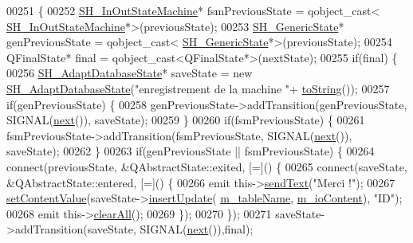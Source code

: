 \begin{DoxyCode}
00251 \{
00252     \hyperlink{classSH__InOutStateMachine}{SH\_InOutStateMachine}* fsmPreviousState = qobject\_cast<
      \hyperlink{classSH__InOutStateMachine}{SH\_InOutStateMachine}*>(previousState);
00253     \hyperlink{classSH__GenericState}{SH\_GenericState}* genPreviousState = qobject\_cast<
      \hyperlink{classSH__GenericState}{SH\_GenericState}*>(previousState);
00254     QFinalState* \textcolor{keyword}{final} = qobject\_cast<QFinalState*>(nextState);
00255     \textcolor{keywordflow}{if}(\textcolor{keyword}{final}) \{
00256         \hyperlink{classSH__AdaptDatabaseState}{SH\_AdaptDatabaseState}* saveState = \textcolor{keyword}{new} 
      \hyperlink{classSH__AdaptDatabaseState}{SH\_AdaptDatabaseState}(\textcolor{stringliteral}{"enregistrement de la machine "}+
      \hyperlink{classSH__InOutStateMachine_a60ecd7de03d948e2d1e9cbedb5c3e5fa}{toString}());
00257         \textcolor{keywordflow}{if}(genPreviousState) \{
00258             genPreviousState->addTransition(genPreviousState, SIGNAL(\hyperlink{classSH__InOutStateMachine_aa9ee51efe0e17dcf5366c8a97b523892}{next}()), saveState);
00259         \}
00260         \textcolor{keywordflow}{if}(fsmPreviousState) \{
00261             fsmPreviousState->addTransition(fsmPreviousState, SIGNAL(\hyperlink{classSH__InOutStateMachine_aa9ee51efe0e17dcf5366c8a97b523892}{next}()), saveState);
00262         \}
00263         \textcolor{keywordflow}{if}(genPreviousState || fsmPreviousState) \{
00264             connect(previousState, &QAbstractState::exited, [=]() \{
00265                 connect(saveState, &QAbstractState::entered, [=]() \{
00266                     emit this->\hyperlink{classSH__InOutStateMachine_ae2cbbe3cd207158668dcb4838938c7ad}{sendText}(\textcolor{stringliteral}{"Merci !"});
00267                     \hyperlink{classSH__InOutStateMachine_aa2766b7a7ba39c35a10df7fc0c151b4f}{setContentValue}(saveState->\hyperlink{classSH__AdaptDatabaseState_ab010e64da052db416328d3bcb9ca01d4}{insertUpdate}(
      \hyperlink{classSH__InOutStateMachine_acc0f5d5133af2dcca30939f53ec8837b}{m\_tableName}, \hyperlink{classSH__InOutStateMachine_a661a1c7bd3b1086b3b5cd60ca957ecbd}{m\_ioContent}), \textcolor{stringliteral}{"ID"});
00268                     emit this->\hyperlink{classSH__InOutStateMachine_ad722deb53285919796b04db5af6e51b4}{clearAll}();
00269                 \});
00270             \});
00271             saveState->addTransition(saveState, SIGNAL(\hyperlink{classSH__InOutStateMachine_aa9ee51efe0e17dcf5366c8a97b523892}{next}()),\textcolor{keyword}{final});

\end{DoxyCode}
